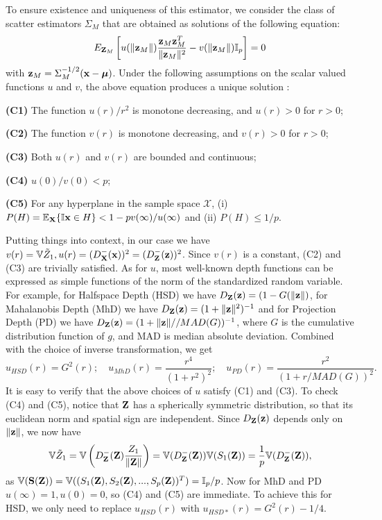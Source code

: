 To ensure existence and uniqueness of this estimator, we consider the class of scatter estimators $\Sigma_M$ that are obtained as solutions of the following equation:
%
\begin{equation}
E_{{\mathbf{Z}}_M} \left[ u( \| {\bf{z}}_M \| )  \frac{{\bf{z}}_M {\bf{z}}_M^T}{\| {\bf{z}}_M \|^2}  - v( \| {\bf{z}}_M \| ) {\mathbb{I}}_p \right] = 0
\end{equation}
%
with ${\bf{z}}_M = \Sigma_M^{-1/2} ({\bf{x}} - {\boldsymbol{\mu}})$. Under the following assumptions on the scalar valued functions $u$ and $v$, the above equation produces a unique solution \citep{HuberBook81}:
%

\vspace{1em}
\noindent\textbf{(C1)} The function $u(r)/r^2$ is monotone decreasing, and $u(r)>0$ for $r>0$;

\noindent\textbf{(C2)}  The function $v(r)$ is monotone decreasing, and $v(r)>0$ for $r>0$;

\noindent\textbf{(C3)} Both $u(r)$ and $v(r)$ are bounded and continuous;

\noindent\textbf{(C4)} $u(0) / v(0) < p$;

\noindent\textbf{(C5)} For any hyperplane in the sample space $\mathcal X$, (i) $P(H) = {\mathbb{E}}_{\mathbf{X}} \{ {\mathbb{I}}{{\bf{x}} \in H} \} < 1 - p v(\infty) / u(\infty)$ and (ii) $P(H) \leq 1/p$.
%

\vspace{1em}
\noindent Putting things into context, in our case we have $v(r) = {\mathbb{V}}\tilde Z_1, u(r) = (D^-_{\mathbf{X}}({\bf{x}}))^2 = (D^-_{\mathbf{Z}}({\bf{z}}))^2$. Since $v(r)$ is a constant, (C2) and (C3) are trivially satisfied. As for $u$, most well-known depth functions can be expressed as simple functions of the norm of the standardized random variable. For example, for Halfspace Depth (HSD) we have $D_{\mathbf{Z}} ({\bf{z}}) = (1 - G(\| {\bf{z}} \|)$, for Mahalanobis Depth (MhD) we have $D_{\mathbf{Z}} ({\bf{z}}) = (1+\| {\bf{z}} \|^2)^{-1}$ and for Projection Depth (PD) we have $D_{\mathbf{Z}} ({\bf{z}}) = (1+\| {\bf{z}} \|//MAD(G))^{-1}$, where $G$ is the cumulative distribution function of $g$, and MAD is median absolute deviation. Combined with the choice of inverse transformation, we get
$$
u_{HSD} (r) = G^2 (r); \quad u_{MhD}(r)  = \frac{r^4}{(1 + r^2)^2}; \quad u_{PD}(r)  = \frac{r^2}{(1 + r/MAD(G))^2}.
$$
%
It is easy to verify that the above choices of $u$ satisfy (C1) and (C3). To check (C4) and (C5), notice that ${\mathbf{Z}}$ has a spherically symmetric distribution, so that its euclidean norm and spatial sign are independent. Since $D_{\mathbf{Z}}({\bf{z}})$ depends only on $\| {\bf{z}} \|$, we now have
%
$$
{\mathbb{V}} \tilde Z_1 = {\mathbb{V}} \left( D^-_{\mathbf{Z}} ({\mathbf{Z}}) \frac{Z_1}{ \|{\mathbf{Z}} \|} \right) = {\mathbb{V}} (D^-_{\mathbf{Z}} ({\mathbf{Z}})) {\mathbb{V}} (S_1 ({\mathbf{Z}})) = \frac{1}{p} {\mathbb{V}} (D^-_{\mathbf{Z}} ({\mathbf{Z}})),
$$
%
as ${\mathbb{V}}({\mathbf{S}}({\mathbf{Z}})) = {\mathbb{V}}((S_1({\mathbf{Z}}), S_2({\mathbf{Z}}), ..., S_p({\mathbf{Z}}))^T) = {\mathbb{I}}_p/p$. Now for MhD and PD $u(\infty)=1, u(0)=0$, so (C4) and (C5) are immediate. To achieve this for HSD, we only need to replace $u_{HSD}(r)$ with $u_{HSD*}(r) = G^2(r) - 1/4$.

